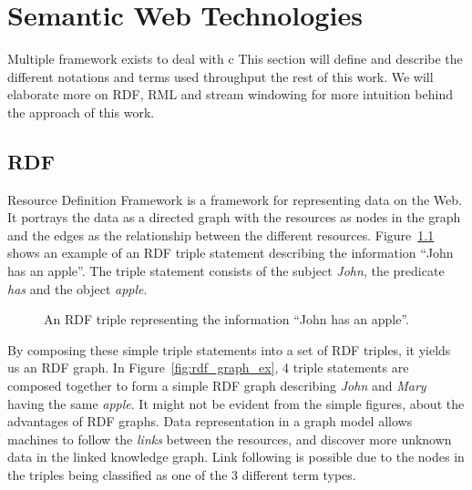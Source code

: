 

\chapter{Semantic Web Technologies}
Multiple framework exists to deal with c
This section will define and describe the different notations and terms used throughput
the rest of this work. We will elaborate more on RDF, RML and stream windowing for more
intuition behind the approach of this work.


\section{RDF}
Resource Definition Framework \cite{rdf_concepts} is a framework for representing data on the Web.
It portrays the data as a directed graph with the resources as nodes in the graph and the
edges as the relationship between the different resources.
Figure~\ref{fig:rdf_triple_ex} shows an example of an RDF triple statement describing
the information “John has an apple”.
The triple statement consists of the subject \textit{John}, the predicate \textit{has}
and the object \textit{apple}.

\begin{figure}[htbp]
    \centering
    \caption{An RDF triple representing the information “John has an apple”.}

    \label{fig:rdf_triple_ex}
\end{figure}


By composing these simple triple statements into a set of RDF triples, it yields us an RDF graph.
In Figure~\ref{fig:rdf_graph_ex}, 4 triple statements are composed together to form a
simple RDF graph describing \textit{John} and \textit{Mary} having the same \textit{apple}.
It might not be evident from the simple figures, about the advantages of
RDF graphs. Data representation in a graph model allows machines to follow the
\textit{links} between the resources, and discover more unknown
data in the linked knowledge graph. Link following is possible due to the nodes in
the triples being classified as one of the 3 different term types.

